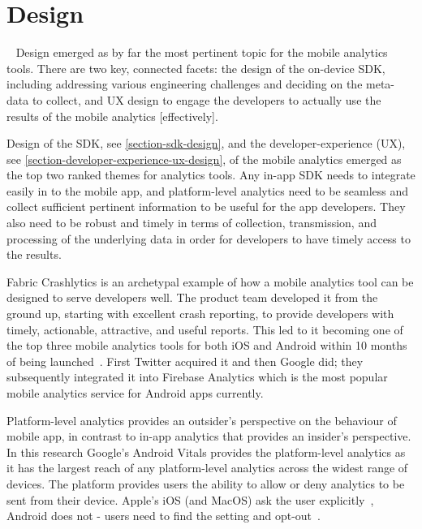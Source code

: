 \section{Design}~\label{section-design}
Design emerged as by far the most pertinent topic for the mobile analytics tools. There are two key, connected facets: the design of the on-device SDK, including addressing various engineering challenges and deciding on the meta-data to collect, and UX design to engage the developers to actually use the results of the mobile analytics [effectively].

Design of the SDK, see \ref{section-sdk-design}, and the developer-experience (UX), see \ref{section-developer-experience-ux-design}, of the mobile analytics emerged as the top two ranked themes for analytics tools. Any in-app SDK needs to integrate easily in to the mobile app, and platform-level analytics need to be seamless and collect sufficient pertinent information to be useful for the app developers. They also need to be robust and timely in terms of collection, transmission, and processing of the underlying data in order for developers to have timely access to the results. 

Fabric Crashlytics is an archetypal example of how a mobile analytics tool can be designed to serve developers well. The product team developed it from the ground up, starting with excellent crash reporting, to provide developers with timely, actionable, attractive, and useful reports. This led to it becoming one of the top three mobile analytics tools for both iOS and Android within 10 months of being launched~\citep{___answersblog_2015_may_crashlytics-no1-in-performance}. %
First Twitter acquired it and then Google did; they subsequently integrated it into Firebase Analytics which is the most popular mobile analytics service for Android apps currently.

Platform-level analytics provides an outsider's perspective on the behaviour of mobile app, in contrast to in-app analytics that provides an insider's perspective. In this research Google's Android Vitals provides the platform-level analytics as it has the largest reach of any platform-level analytics across the widest range of devices. The platform provides users the ability to allow or deny analytics to be sent from their device. Apple's iOS (and MacOS) ask the user explicitly~\citep{apple_ios_share_diagnostics}, Android does not - users need to find the setting and opt-out~\citep{google_play_share_usage_and_diagnostics_info_with_google}. %

